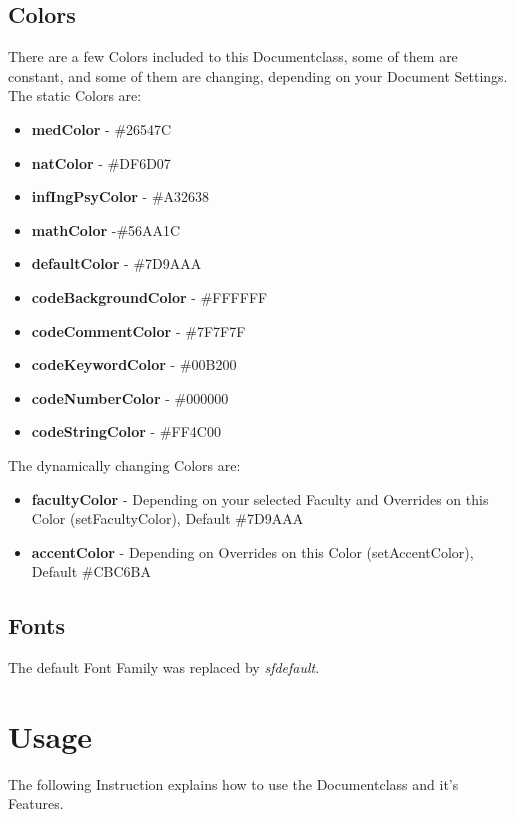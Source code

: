 \documentclass[a4paper]{../uulm-document}
\begin{document}
\subsection{Colors}
There are a few Colors included to this Documentclass, some of them are constant, and some of them are changing, depending on your Document Settings. 
The static Colors are:
\begin{itemize}
\item \textbf{medColor} - {\color{medColor}\#26547C}
\item \textbf{natColor} - {\color{natColor}\#DF6D07}
\item \textbf{infIngPsyColor} - {\color{infIngPsyColor}\#A32638}
\item \textbf{mathColor} -{\color{mathColor}\#56AA1C}
\item \textbf{defaultColor} - {\color{defaultColor}\#7D9AAA}
\item \textbf{codeBackgroundColor} - {\color{black}\#FFFFFF}
\item \textbf{codeCommentColor} - {\color{codeCommentColor}\#7F7F7F}
\item \textbf{codeKeywordColor} - {\color{codeKeywordColor}\#00B200}
\item \textbf{codeNumberColor} - {\color{codeNumberColor}\#000000}
\item \textbf{codeStringColor} - {\color{codeStringColor}\#FF4C00}
\end{itemize}
The dynamically changing Colors are:
\begin{itemize}
\item \textbf{facultyColor} - Depending on your selected Faculty and Overrides on this Color (setFacultyColor), Default {\color{defaultColor}\#7D9AAA}
\item \textbf{accentColor} - Depending on Overrides on this Color (setAccentColor), Default {\color{black}\#CBC6BA}
\end{itemize}

\subsection{Fonts}
The default Font Family was replaced by \textit{sfdefault}.

\newpage

\section{Usage}
The following Instruction explains how to use the Documentclass and it's Features.
\end{document}
